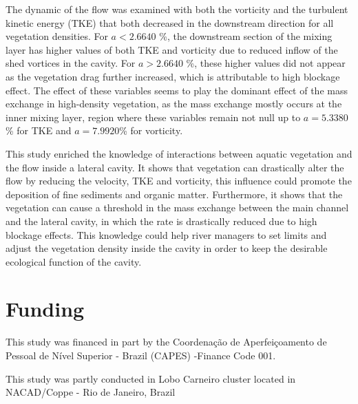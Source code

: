 The dynamic of the flow was examined with both the vorticity and the turbulent kinetic energy (TKE) that both decreased in the downstream direction for all vegetation densities. For $a<2.6640$ \%, the downstream section of the mixing layer has higher values of both TKE and vorticity due to reduced inflow of the shed vortices in the cavity. For $a>2.6640$ \%, these higher values did not appear as the vegetation drag further increased, which is attributable to high blockage effect. The effect of these variables seems to play the dominant effect of the mass exchange in high-density vegetation, as the mass exchange mostly occurs at the inner mixing layer, region where these variables remain not null up to $a=5.3380$ \% for TKE and $a=7.9920$\% for vorticity.

This study enriched the knowledge of interactions between aquatic vegetation and the flow inside a lateral cavity. It shows that vegetation can drastically alter the flow by reducing the velocity, TKE and vorticity, this influence could promote the deposition of fine sediments and organic matter. Furthermore, it shows that the vegetation can cause a threshold in the mass exchange between the main channel and the lateral cavity, in which the rate is drastically reduced due to high blockage effects. This knowledge could help river managers to set limits and adjust the vegetation density inside the cavity in order to keep the desirable ecological function of the cavity.

\section*{Funding}
This study was financed in part by the Coordenação de Aperfeiçoamento de Pessoal de Nível Superior - Brazil (CAPES) -Finance Code 001.

This study was partly conducted in Lobo Carneiro cluster located in NACAD/Coppe - Rio de Janeiro, Brazil

\printbibliography[segment=\therefsegment,heading=subbibliography, title={References}]